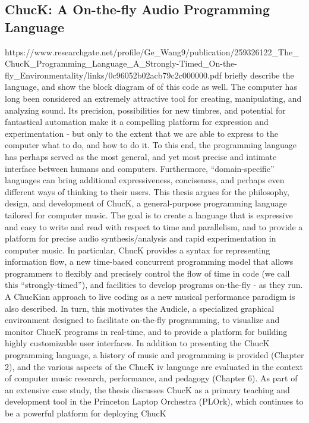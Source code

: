 \subsection{ChucK: A On-the-fly Audio Programming Language}
https://www.researchgate.net/profile/Ge_Wang9/publication/259326122_The_ChucK_Programming_Language_A_Strongly-Timed_On-the-fly_Environmentality/links/0c96052b02acb79c2c000000.pdf
briefly describe the language, and show the block diagram of of this code as well. 
The computer has long been considered an extremely attractive tool for creating,
manipulating, and analyzing sound. Its precision, possibilities for new timbres, and
potential for fantastical automation make it a compelling platform for expression
and experimentation - but only to the extent that we are able to express to the
computer what to do, and how to do it. To this end, the programming language
has perhaps served as the most general, and yet most precise and intimate interface
between humans and computers. Furthermore, “domain-specific” languages can
bring additional expressiveness, conciseness, and perhaps even different ways of
thinking to their users.
This thesis argues for the philosophy, design, and development of ChucK, a
general-purpose programming language tailored for computer music. The goal is to
create a language that is expressive and easy to write and read with respect to time
and parallelism, and to provide a platform for precise audio synthesis/analysis and
rapid experimentation in computer music. In particular, ChucK provides a syntax
for representing information flow, a new time-based concurrent programming model
that allows programmers to flexibly and precisely control the flow of time in code (we
call this “strongly-timed”), and facilities to develop programs on-the-fly - as they
run. A ChucKian approach to live coding as a new musical performance paradigm is
also described. In turn, this motivates the Audicle, a specialized graphical environment designed to facilitate on-the-fly programming, to visualize and monitor ChucK
programs in real-time, and to provide a platform for building highly customizable
user interfaces.
In addition to presenting the ChucK programming language, a history of music
and programming is provided (Chapter 2), and the various aspects of the ChucK
iv
language are evaluated in the context of computer music research, performance,
and pedagogy (Chapter 6). As part of an extensive case study, the thesis discusses
ChucK as a primary teaching and development tool in the Princeton Laptop Orchestra (PLOrk), which continues to be a powerful platform for deploying ChucK
